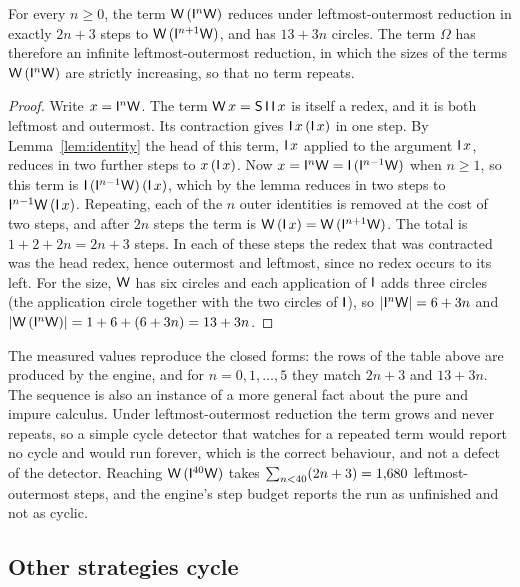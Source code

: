 \begin{lemma}\label{lem:omega}
For every $n\ge0$, the term $\mathsf{W}\,(\mathsf{I}^n\mathsf{W})$ reduces under leftmost-outermost reduction in exactly $2n+3$ steps to $\mathsf{W}\,(\mathsf{I}^{n+1}\mathsf{W})$, and has $13+3n$ circles. The term $\Omega$ has therefore an infinite leftmost-outermost reduction, in which the sizes of the terms $\mathsf{W}\,(\mathsf{I}^n\mathsf{W})$ are strictly increasing, so that no term repeats.
\end{lemma}

\begin{proof}
Write $x=\mathsf{I}^n\mathsf{W}$. The term $\mathsf{W}\,x=\mathsf{S}\,\mathsf{I}\,\mathsf{I}\,x$ is itself a redex, and it is both leftmost and outermost. Its contraction gives $\mathsf{I}\,x\,(\mathsf{I}\,x)$ in one step. By Lemma~\ref{lem:identity} the head of this term, $\mathsf{I}\,x$ applied to the argument $\mathsf{I}\,x$, reduces in two further steps to $x\,(\mathsf{I}\,x)$. Now $x=\mathsf{I}^n\mathsf{W}=\mathsf{I}\,(\mathsf{I}^{n-1}\mathsf{W})$ when $n\ge1$, so this term is $\mathsf{I}\,(\mathsf{I}^{n-1}\mathsf{W})\,(\mathsf{I}\,x)$, which by the lemma reduces in two steps to $\mathsf{I}^{n-1}\mathsf{W}\,(\mathsf{I}\,x)$. Repeating, each of the $n$ outer identities is removed at the cost of two steps, and after $2n$ steps the term is $\mathsf{W}\,(\mathsf{I}\,x)=\mathsf{W}\,(\mathsf{I}^{n+1}\mathsf{W})$. The total is $1+2+2n=2n+3$ steps. In each of these steps the redex that was contracted was the head redex, hence outermost and leftmost, since no redex occurs to its left. For the size, $\mathsf{W}$ has six circles and each application of $\mathsf{I}$ adds three circles (the application circle together with the two circles of $\mathsf{I}$), so $\lvert \mathsf{I}^n\mathsf{W}\rvert=6+3n$ and $\lvert \mathsf{W}\,(\mathsf{I}^n\mathsf{W})\rvert=1+6+(6+3n)=13+3n$.
\end{proof}

\begin{center}
\tableOmega
\end{center}

The measured values reproduce the closed forms: the rows of the table above are produced by the engine, and for $n=0,1,\dots,5$ they match $2n+3$ and $13+3n$. The sequence is also an instance of a more general fact about the pure and impure calculus. Under leftmost-outermost reduction the term grows and never repeats, so a simple cycle detector that watches for a repeated term would report no cycle and would run forever, which is the correct behaviour, and not a defect of the detector. Reaching $\mathsf{W}\,(\mathsf{I}^{40}\mathsf{W})$ takes $\sum_{n<40}(2n+3)=1{,}680$ leftmost-outermost steps, and the engine's step budget reports the run as unfinished and not as cyclic.

\subsection{Other strategies cycle}

